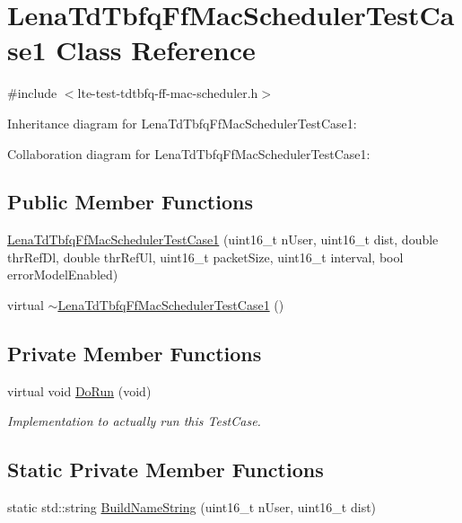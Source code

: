 \hypertarget{classLenaTdTbfqFfMacSchedulerTestCase1}{}\section{Lena\+Td\+Tbfq\+Ff\+Mac\+Scheduler\+Test\+Case1 Class Reference}
\label{classLenaTdTbfqFfMacSchedulerTestCase1}


{\ttfamily \#include $<$lte-\/test-\/tdtbfq-\/ff-\/mac-\/scheduler.\+h$>$}



Inheritance diagram for Lena\+Td\+Tbfq\+Ff\+Mac\+Scheduler\+Test\+Case1\+:


Collaboration diagram for Lena\+Td\+Tbfq\+Ff\+Mac\+Scheduler\+Test\+Case1\+:
\subsection*{Public Member Functions}
\begin{DoxyCompactItemize}
\item 
\hyperlink{classLenaTdTbfqFfMacSchedulerTestCase1_a2763a2af999d8cf72066f0d85a32cf3f}{Lena\+Td\+Tbfq\+Ff\+Mac\+Scheduler\+Test\+Case1} (uint16\+\_\+t n\+User, uint16\+\_\+t dist, double thr\+Ref\+Dl, double thr\+Ref\+Ul, uint16\+\_\+t packet\+Size, uint16\+\_\+t interval, bool error\+Model\+Enabled)
\item 
virtual \hyperlink{classLenaTdTbfqFfMacSchedulerTestCase1_a3919bb65f0b948d6899c5897dad26a23}{$\sim$\+Lena\+Td\+Tbfq\+Ff\+Mac\+Scheduler\+Test\+Case1} ()
\end{DoxyCompactItemize}
\subsection*{Private Member Functions}
\begin{DoxyCompactItemize}
\item 
virtual void \hyperlink{classLenaTdTbfqFfMacSchedulerTestCase1_a7cc404c3537ef82bd8c4d8ebee0af929}{Do\+Run} (void)
\begin{DoxyCompactList}\small\item\em Implementation to actually run this Test\+Case. \end{DoxyCompactList}\end{DoxyCompactItemize}
\subsection*{Static Private Member Functions}
\begin{DoxyCompactItemize}
\item 
static std\+::string \hyperlink{classLenaTdTbfqFfMacSchedulerTestCase1_adfd875b69d9d814b6b01f391f92398fa}{Build\+Name\+String} (uint16\+\_\+t n\+User, uint16\+\_\+t dist)
\end{DoxyCompactItemize}
